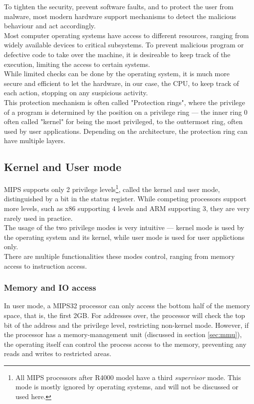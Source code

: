 To tighten the security, prevent software faults, and to protect the user from
malware, most modern hardware support mechanisms to detect the malicious behaviour
and act accordingly.\\
Most computer operating systems have access to different resources, ranging from
widely available devices to critical subsystems. To prevent malicious
program or defective code to take over the machine, it is desireable to keep
track of the execution, limiting the access to certain systems.\\
While limited checks can be done by the operating system, it is much more
secure and efficient to let the hardware, in our case, the CPU, to keep track
of each action, stopping on any suspicious activity.\\
This protection mechanism is often called "Protection rings", where the privilege
of a program is determined by the position on a privilege ring --- the inner ring 0
often called "kernel" for being the most privileged, to the outtermost ring,
often used by user applications. Depending on the architecture, the protection
ring can have multiple layers.

\subsection{Kernel and User mode}
MIPS supports only 2 privilege levels\footnote{All MIPS processors after R4000 model have a
third \textit{supervisor} mode. This mode is mostly ignored by operating systems,
and will not be discussed or used here.\cite{see_mips_run}}, called the kernel and user mode,
distinguished by a bit in the status register. While competing processors support
more levels, such as x86 supporting 4\cite{intelmanual} levels and ARM supporting 3\cite{arm:migrating_5_7},
they are very rarely used in practice.\\
The usage of the two privilege modes is very intuitive --- kernel mode is used
by the operating system and its kernel, while user mode is used for user applictions
only.\\
There are multiple functionalities these modes control, ranging from memory access
to instruction access.

\subsubsection{Memory and IO access}
In user mode, a MIPS32 processor can only access the bottom half of the memory
space, that is, the first 2GB. For addresses over, the processor will check
the top bit of the address and the privilege level, restricting non-kernel mode.
However, if the processor has a memory-management unit (discussed in section \ref{sec:mmu}),
the operating itself can control the process access to the memory, preventing
any reads and writes to restricted areas.

